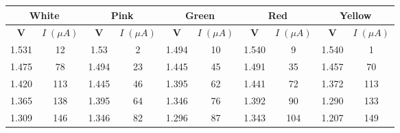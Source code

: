 \begin{table}[H]
	\centering
	\begin{tabular}{|cc|cc|cc|cc|cc|}
		\hline
		\multicolumn{2}{|c|}{\textbf{White}} & \multicolumn{2}{c|}{\textbf{Pink}} & \multicolumn{2}{c|}{\textbf{Green}} & \multicolumn{2}{c|}{\textbf{Red}} & \multicolumn{2}{c|}{\textbf{Yellow}}                                                                                                                                             \\ \hline
		\multicolumn{1}{|c|}{\textbf{V}}     & \textbf{$I\;(\mu A)$}              & \multicolumn{1}{c|}{\textbf{V}}     & \textbf{$I\;(\mu A)$}             & \multicolumn{1}{c|}{\textbf{V}}      & \textbf{$I\;(\mu A)$} & \multicolumn{1}{c|}{\textbf{V}} & \textbf{$I\;(\mu A)$} & \multicolumn{1}{c|}{\textbf{V}} & \textbf{$I\;(\mu A)$} \\ \hline
		\multicolumn{1}{|c|}{1.531}          & 12                                 & \multicolumn{1}{c|}{1.53}           & 2                                 & \multicolumn{1}{c|}{1.494}           & 10                    & \multicolumn{1}{c|}{1.540}      & 9                     & \multicolumn{1}{c|}{1.540}      & 1                     \\ \hline
		\multicolumn{1}{|c|}{1.475}          & 78                                 & \multicolumn{1}{c|}{1.494}          & 23                                & \multicolumn{1}{c|}{1.445}           & 45                    & \multicolumn{1}{c|}{1.491}      & 35                    & \multicolumn{1}{c|}{1.457}      & 70                    \\ \hline
		\multicolumn{1}{|c|}{1.420}          & 113                                & \multicolumn{1}{c|}{1.445}          & 46                                & \multicolumn{1}{c|}{1.395}           & 62                    & \multicolumn{1}{c|}{1.441}      & 72                    & \multicolumn{1}{c|}{1.372}      & 113                   \\ \hline
		\multicolumn{1}{|c|}{1.365}          & 138                                & \multicolumn{1}{c|}{1.395}          & 64                                & \multicolumn{1}{c|}{1.346}           & 76                    & \multicolumn{1}{c|}{1.392}      & 90                    & \multicolumn{1}{c|}{1.290}      & 133                   \\ \hline
		\multicolumn{1}{|c|}{1.309}          & 146                                & \multicolumn{1}{c|}{1.346}          & 82                                & \multicolumn{1}{c|}{1.296}           & 87                    & \multicolumn{1}{c|}{1.343}      & 104                   & \multicolumn{1}{c|}{1.207}      & 149                   \\ \hline

\end{tabular}
\end{table}

